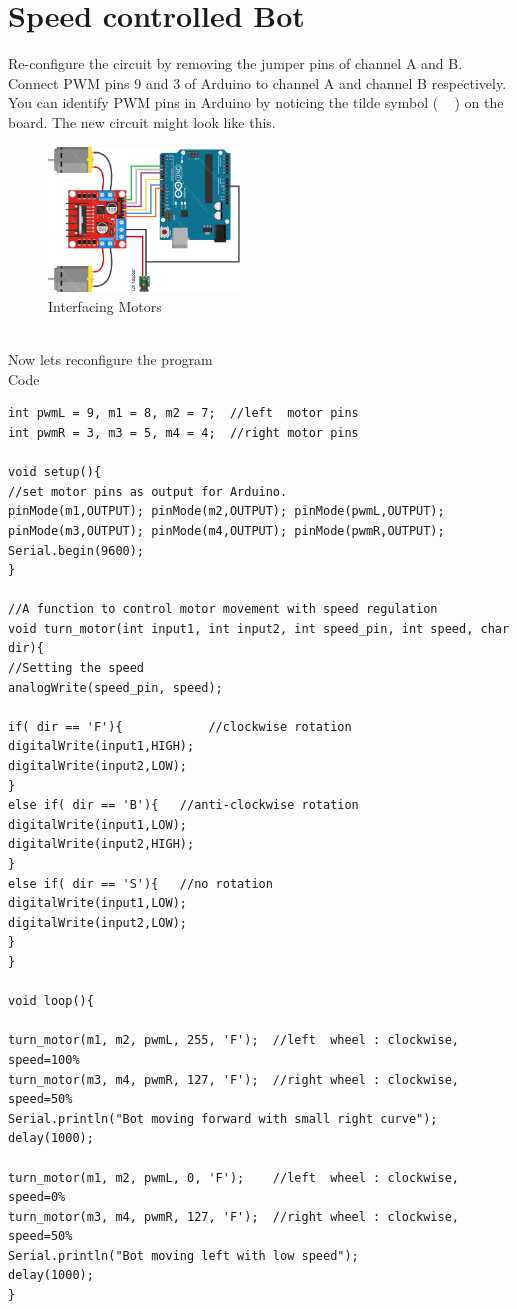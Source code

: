 \section{Speed controlled Bot}
Re-configure the circuit by removing the jumper pins of channel A and B. Connect PWM pins 9 and 3 of Arduino to channel A and channel B respectively. You can identify PWM pins in Arduino by noticing the tilde symbol ( ~ ) on the board. The new circuit might look like this.
\begin{figure}
    \centering
    \includegraphics[width=2in]{Chapters/images/MotorDriver_circuit2.png}
    \caption{Interfacing Motors}
\end{figure} \\
Now lets reconfigure the program \\
Code\\
\begin{lstlisting}[style=CStyle]
int pwmL = 9, m1 = 8, m2 = 7;  //left  motor pins
int pwmR = 3, m3 = 5, m4 = 4;  //right motor pins

void setup(){
//set motor pins as output for Arduino.
pinMode(m1,OUTPUT); pinMode(m2,OUTPUT); pinMode(pwmL,OUTPUT);
pinMode(m3,OUTPUT); pinMode(m4,OUTPUT); pinMode(pwmR,OUTPUT);
Serial.begin(9600);
}

//A function to control motor movement with speed regulation
void turn_motor(int input1, int input2, int speed_pin, int speed, char dir){
//Setting the speed
analogWrite(speed_pin, speed);

if( dir == 'F'){			//clockwise rotation
digitalWrite(input1,HIGH);
digitalWrite(input2,LOW);
}
else if( dir == 'B'){	//anti-clockwise rotation
digitalWrite(input1,LOW);
digitalWrite(input2,HIGH);
}
else if( dir == 'S'){	//no rotation
digitalWrite(input1,LOW);
digitalWrite(input2,LOW);
}
}

void loop(){

turn_motor(m1, m2, pwmL, 255, 'F');  //left  wheel : clockwise, speed=100%
turn_motor(m3, m4, pwmR, 127, 'F');  //right wheel : clockwise, speed=50%
Serial.println("Bot moving forward with small right curve");
delay(1000);

turn_motor(m1, m2, pwmL, 0, 'F');    //left  wheel : clockwise, speed=0%
turn_motor(m3, m4, pwmR, 127, 'F');  //right wheel : clockwise, speed=50%
Serial.println("Bot moving left with low speed");
delay(1000);
}

\end{lstlisting}
